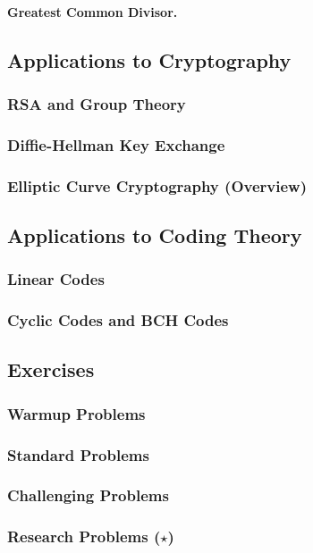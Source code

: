 \paragraph{Greatest Common Divisor.}

\subsection{Applications to Cryptography}
\label{subsec:crypto-algebra}

\subsubsection{RSA and Group Theory}
\subsubsection{Diffie-Hellman Key Exchange}
\subsubsection{Elliptic Curve Cryptography (Overview)}

\subsection{Applications to Coding Theory}
\label{subsec:coding-algebra}

\subsubsection{Linear Codes}
\subsubsection{Cyclic Codes and BCH Codes}

\subsection{Exercises}
\subsubsection{Warmup Problems}
\subsubsection{Standard Problems}
\subsubsection{Challenging Problems}
\subsubsection{Research Problems ($\star$)}

